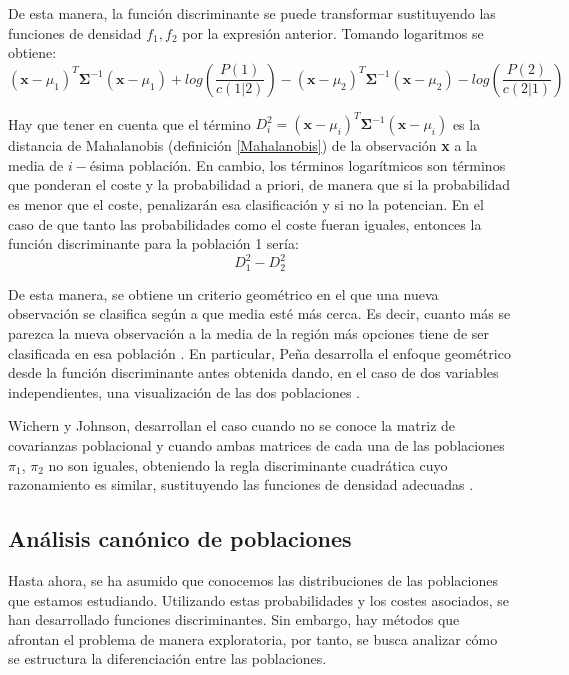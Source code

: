 \noindent De esta manera, la función discriminante se puede transformar sustituyendo las funciones de densidad $f_1,f_2$ por la expresión anterior. Tomando logaritmos se obtiene: 
\begin{equation}
(\textbf{x}-\mu_1)^T \mathbf{\Sigma}^{-1}(\textbf{x}-\mu_1)+log\left(\dfrac{P(1)}{c(1|2)}\right)-(\textbf{x}-\mu_2)^T \mathbf{\Sigma}^{-1} (\textbf{x}-\mu_2)-log\left(\dfrac{P(2)}{c(2|1)}\right)
\end{equation}

\noindent Hay que tener en cuenta que el término $D_i^2=(\textbf{x}-\mu_i)^T \mathbf{\Sigma}^{-1} (\textbf{x}-\mu_i)$ es la distancia de Mahalanobis (definición \ref{Mahalanobis}) de la observación \textbf{x} a la media de $i-$ésima población. En cambio, los  términos logarítmicos son términos que ponderan el coste y la probabilidad a priori, de manera que si la probabilidad es menor que el coste, penalizarán esa clasificación y si no la potencian. En el caso de que tanto las probabilidades como el coste fueran iguales, entonces la función discriminante para la población 1 sería:
\begin{equation}
D_1^2-D_2^2
\end{equation}

\noindent De esta manera, se obtiene un criterio geométrico  en el que una nueva observación se clasifica según a que media esté más cerca. Es decir, cuanto más se parezca la nueva observación a la media de la región más opciones tiene de ser clasificada en esa población \cite{Cuadras 2014}.  En particular, Peña desarrolla el enfoque geométrico desde la función discriminante antes obtenida dando, en el caso de dos variables independientes, una visualización de las dos poblaciones \cite{Peña 2002}.

\noindent Wichern y Johnson, desarrollan el caso cuando no se conoce la matriz de covarianzas poblacional y cuando ambas matrices de cada una de las poblaciones $\pi_1$, $\pi_2$ no son iguales, obteniendo la regla discriminante cuadrática cuyo razonamiento es similar, sustituyendo las funciones de densidad adecuadas \cite{Johnson 2007}.

\subsection{Análisis canónico de poblaciones}

\noindent Hasta ahora, se ha asumido que conocemos las distribuciones de las poblaciones que estamos estudiando. Utilizando estas probabilidades y los costes asociados, se han desarrollado funciones discriminantes. Sin embargo, hay métodos que afrontan el problema de manera exploratoria, por tanto, se busca analizar cómo  se estructura la diferenciación entre las poblaciones. 

